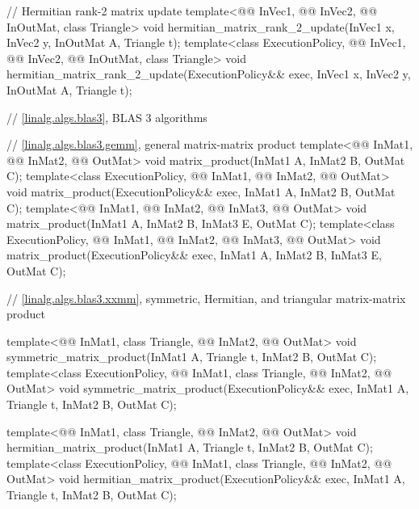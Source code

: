 \begin{codeblock}
{  // Hermitian rank-2 matrix update
  template<@@ InVec1, @@ InVec2,
           @@ InOutMat, class Triangle>
    void hermitian_matrix_rank_2_update(InVec1 x, InVec2 y, InOutMat A, Triangle t);
  template<class ExecutionPolicy, @@ InVec1, @@ InVec2,
           @@ InOutMat, class Triangle>
    void hermitian_matrix_rank_2_update(ExecutionPolicy&& exec,
                                        InVec1 x, InVec2 y, InOutMat A, Triangle t);

  // \ref{linalg.algs.blas3}, BLAS 3 algorithms

  // \ref{linalg.algs.blas3.gemm}, general matrix-matrix product
  template<@@ InMat1, @@ InMat2, @@ OutMat>
    void matrix_product(InMat1 A, InMat2 B, OutMat C);
  template<class ExecutionPolicy, @@ InMat1, @@ InMat2, @@ OutMat>
    void matrix_product(ExecutionPolicy&& exec,
                        InMat1 A, InMat2 B, OutMat C);
  template<@@ InMat1, @@ InMat2, @@ InMat3, @@ OutMat>
    void matrix_product(InMat1 A, InMat2 B, InMat3 E, OutMat C);
  template<class ExecutionPolicy,
           @@ InMat1, @@ InMat2, @@ InMat3, @@ OutMat>
    void matrix_product(ExecutionPolicy&& exec,
                        InMat1 A, InMat2 B, InMat3 E, OutMat C);

  // \ref{linalg.algs.blas3.xxmm}, symmetric, Hermitian, and triangular matrix-matrix product

  template<@@ InMat1, class Triangle, @@ InMat2, @@ OutMat>
    void symmetric_matrix_product(InMat1 A, Triangle t, InMat2 B, OutMat C);
  template<class ExecutionPolicy,
           @@ InMat1, class Triangle, @@ InMat2, @@ OutMat>
    void symmetric_matrix_product(ExecutionPolicy&& exec,
                                  InMat1 A, Triangle t, InMat2 B, OutMat C);

  template<@@ InMat1, class Triangle, @@ InMat2, @@ OutMat>
    void hermitian_matrix_product(InMat1 A, Triangle t, InMat2 B, OutMat C);
  template<class ExecutionPolicy,
           @@ InMat1, class Triangle, @@ InMat2, @@ OutMat>
    void hermitian_matrix_product(ExecutionPolicy&& exec,
                                  InMat1 A, Triangle t, InMat2 B, OutMat C);

}
\end{codeblock}
